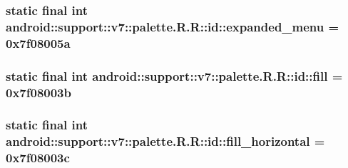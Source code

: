 \hypertarget{classandroid_1_1support_1_1v7_1_1palette_1_1_r_1_1id_ac837827b42792992d5b1f5c993c0b9c}{
\subsubsection[{expanded\_\-menu}]{\setlength{\rightskip}{0pt plus 5cm}static final int android::support::v7::palette.R.R::id::expanded\_\-menu = 0x7f08005a}}
\label{classandroid_1_1support_1_1v7_1_1palette_1_1_r_1_1id_ac837827b42792992d5b1f5c993c0b9c}


\hypertarget{classandroid_1_1support_1_1v7_1_1palette_1_1_r_1_1id_6579bc846ab68000649b3d8e33a8cf81}{
\subsubsection[{fill}]{\setlength{\rightskip}{0pt plus 5cm}static final int android::support::v7::palette.R.R::id::fill = 0x7f08003b}}
\label{classandroid_1_1support_1_1v7_1_1palette_1_1_r_1_1id_6579bc846ab68000649b3d8e33a8cf81}


\hypertarget{classandroid_1_1support_1_1v7_1_1palette_1_1_r_1_1id_5b51c4adb5deda72890fe1156ba1e3dd}{
\subsubsection[{fill\_\-horizontal}]{\setlength{\rightskip}{0pt plus 5cm}static final int android::support::v7::palette.R.R::id::fill\_\-horizontal = 0x7f08003c}}
\label{classandroid_1_1support_1_1v7_1_1palette_1_1_r_1_1id_5b51c4adb5deda72890fe1156ba1e3dd}


